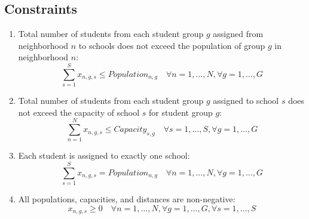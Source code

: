 \documentclass{article}
\begin{document}
\subsection*{Constraints}
\begin{enumerate}
    \item Total number of students from each student group $g$ assigned from neighborhood $n$ to schools does not exceed the population of group $g$ in neighborhood $n$:
    \[
    \sum_{s=1}^{S} x_{n,g,s} \leq Population_{n,g} \quad \forall n = 1, \ldots, N, \forall g = 1, \ldots, G
    \]
    
    \item Total number of students from each student group $g$ assigned to school $s$ does not exceed the capacity of school $s$ for student group $g$:
    \[
    \sum_{n=1}^{N} x_{n,g,s} \leq Capacity_{s,g} \quad \forall s = 1, \ldots, S, \forall g = 1, \ldots, G
    \]
    
    \item Each student is assigned to exactly one school:
    \[
    \sum_{s=1}^{S} x_{n,g,s} = Population_{n,g} \quad \forall n = 1, \ldots, N, \forall g = 1, \ldots, G
    \]
    
    \item All populations, capacities, and distances are non-negative:
    \[
    x_{n,g,s} \geq 0 \quad \forall n = 1, \ldots, N, \forall g = 1, \ldots, G, \forall s = 1, \ldots, S
    \]
\end{enumerate}
\end{document}
